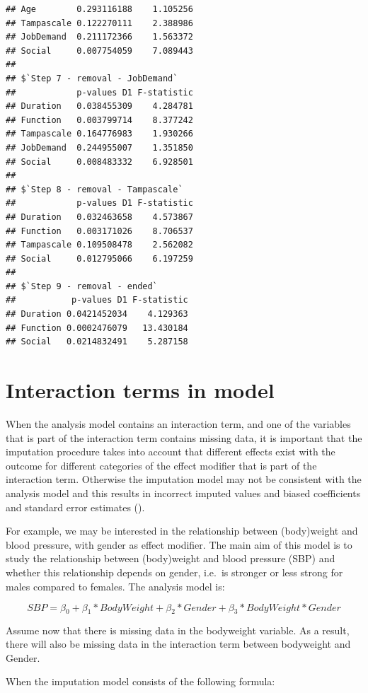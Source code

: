 \documentclass[
]{book}
\begin{document}
\begin{verbatim}
## Age        0.293116188    1.105256
## Tampascale 0.122270111    2.388986
## JobDemand  0.211172366    1.563372
## Social     0.007754059    7.089443
## 
## $`Step 7 - removal - JobDemand`
##            p-values D1 F-statistic
## Duration   0.038455309    4.284781
## Function   0.003799714    8.377242
## Tampascale 0.164776983    1.930266
## JobDemand  0.244955007    1.351850
## Social     0.008483332    6.928501
## 
## $`Step 8 - removal - Tampascale`
##            p-values D1 F-statistic
## Duration   0.032463658    4.573867
## Function   0.003171026    8.706537
## Tampascale 0.109508478    2.562082
## Social     0.012795066    6.197259
## 
## $`Step 9 - removal - ended`
##           p-values D1 F-statistic
## Duration 0.0421452034    4.129363
## Function 0.0002476079   13.430184
## Social   0.0214832491    5.287158
\end{verbatim}

\hypertarget{interaction-terms-in-model}{%
\section{Interaction terms in model}\label{interaction-terms-in-model}}

When the analysis model contains an interaction term, and one of the variables that is part of the interaction term contains missing data, it is important that the imputation procedure takes into account that different effects exist with the outcome for different categories of the effect modifier that is part of the interaction term. Otherwise the imputation model may not be consistent with the analysis model and this results in incorrect imputed values and biased coefficients and standard error estimates (\citet{Bartlett2015}).

For example, we may be interested in the relationship between (body)weight and blood pressure, with gender as effect modifier. The main aim of this model is to study the relationship between (body)weight and blood pressure (SBP) and whether this relationship depends on gender, i.e.~is stronger or less strong for males compared to females. The analysis model is:

\[SBP = β{_0} + β{_1} * BodyWeight + β{_2} * Gender + β{_3} * BodyWeight * Gender\]

Assume now that there is missing data in the bodyweight variable. As a result, there will also be missing data in the interaction term between bodyweight and Gender.

When the imputation model consists of the following formula:
\end{document}
